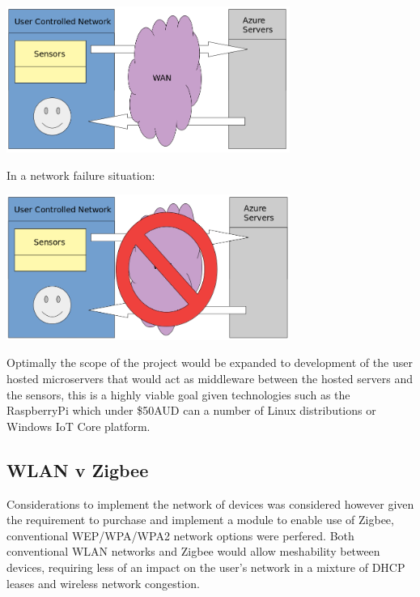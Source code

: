 \documentclass{article}
\begin{document}
            \begin{center}
                \includegraphics[width=350px]{Images/CurrentSystemDiagram.jpg}
            \end{center}
            In a network failure situation:
            \begin{center}
                \includegraphics[width=350px]{Images/CurrentSystemDiagramAlternate.jpg}
            \end{center}

            Optimally the scope of the project would be expanded to development of
            the user hosted microservers that would act as middleware between
            the hosted servers and the sensors, this is a highly viable goal given
            technologies such as the RaspberryPi\cite{RPI} which under \$50AUD 
            can a number of Linux distributions or Windows IoT Core platform.
        
        \subsection{WLAN v Zigbee}
            Considerations to implement the network of devices was considered however given the requirement to purchase and implement a module
            to enable use of Zigbee, conventional WEP/WPA/WPA2 network options 
            were perfered. Both conventional WLAN networks and Zigbee would allow
            meshability between devices, requiring less of an impact on the user's
            network in a mixture of DHCP leases and wireless network congestion.
\end{document}
